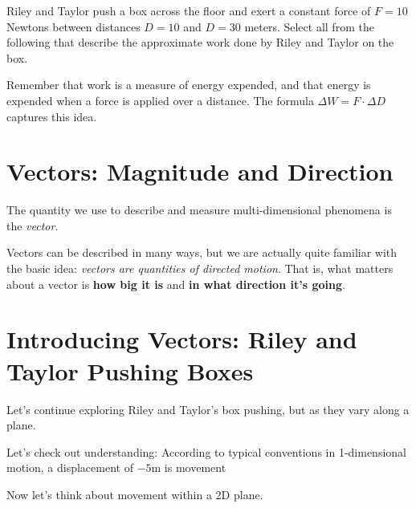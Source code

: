 \documentclass{ximera}
\begin{document}
\begin{problem}
Riley and Taylor push a box across the floor and exert a constant force of $F=10$ Newtons between distances $D=10$ and $D=30$ meters. Select all from the following that describe the approximate work done by Riley and Taylor on the box.

\begin{selectAll}
\end{selectAll}
\begin{feedback}
Remember that work is a measure of energy expended, and that energy is expended when a force is applied over a distance. The formula $\Delta W=F\cdot \Delta D$ captures this idea.
\end{feedback}
\end{problem}


\section*{Vectors: Magnitude and Direction}

The quantity we use to describe and measure multi-dimensional phenomena is the \emph{vector}. 

Vectors can be described in many ways, but we are actually quite familiar with the basic idea: \emph{vectors are quantities of directed motion}. That is, what matters about a vector is {\bf how big it is} and {\bf in what direction it's going}.

\section*{Introducing Vectors: Riley and Taylor Pushing Boxes}

    Let's continue exploring Riley and Taylor's box pushing, but as they vary along a plane.

\begin{problem}
    Let's check out understanding: According to typical conventions in 1-dimensional motion, a displacement of $-5$m is movement 
\end{problem}
    
    Now let's think about movement within a 2D plane.

    \begin{center}
    \end{center}
\end{document}
